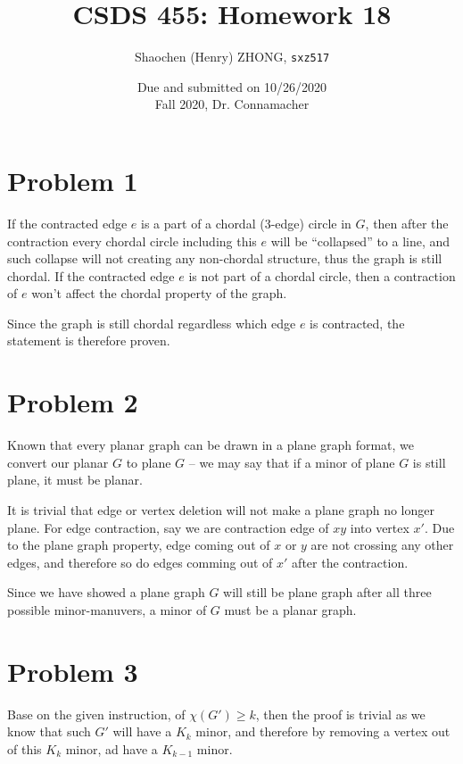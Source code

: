 \documentclass[11pt]{article}
\newcommand{\ilc}{\texttt}
\begin{document}
\title{\textbf{CSDS 455: Homework 18}}

\author{Shaochen (Henry) ZHONG, \ilc{sxz517}}
\date{Due and submitted on 10/26/2020 \\ Fall 2020, Dr. Connamacher}
\maketitle


\section*{Problem 1}

If the contracted edge $e$ is a part of a chordal (3-edge) circle in $G$, then after the contraction every chordal circle including this $e$ will be ``collapsed'' to a line, and such collapse will not creating any non-chordal structure, thus the graph is still chordal. If the contracted edge $e$ is not part of a chordal circle, then a contraction of $e$ won't affect the chordal property of the graph.

Since the graph is still chordal regardless which edge $e$ is contracted, the statement is therefore proven.

\section*{Problem 2}
Known that every planar graph can be drawn in a plane graph format, we convert our planar $G$ to plane $G$ -- we may say that if a minor of plane $G$ is still plane, it must be planar.\newline

It is trivial that edge or vertex deletion will not make a plane graph no longer plane. For edge contraction, say we are contraction edge of $xy$ into vertex $x'$. Due to the plane graph property, edge coming out of $x$ or $y$ are not crossing any other edges, and therefore so do edges comming out of $x'$ after the contraction.

Since we have showed a plane graph $G$ will still be plane graph after all three possible minor-manuvers, a minor of $G$ must be a planar graph.

\section*{Problem 3}

Base on the given instruction, of $\chi(G') \geq k$, then the proof is trivial as we know that such $G'$ will have a $K_k$ minor, and therefore by removing a vertex out of this $K_k$ minor, ad have a $K_{k-1}$ minor.
\end{document}
